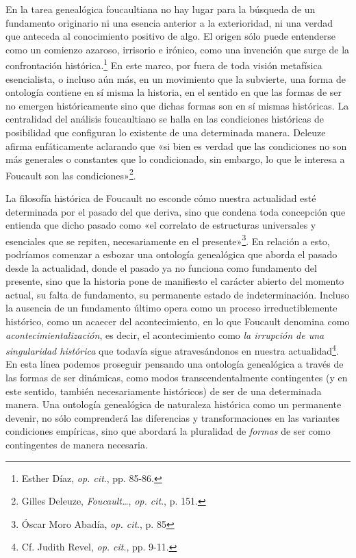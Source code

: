 En la tarea genealógica foucaultiana no hay lugar para la búsqueda de un fundamento originario ni una esencia anterior a la exterioridad, ni una verdad que anteceda al conocimiento positivo de algo. El origen sólo puede entenderse como un comienzo azaroso, irrisorio e irónico, como una invención que surge de la confrontación histórica.\footnote{Esther Díaz, \emph{op. cit}., pp. 85-86.} En este marco, por fuera de toda visión metafísica esencialista, o incluso aún más, en un movimiento que la subvierte, una forma de ontología contiene en sí misma la historia, en el sentido en que las formas de ser no emergen históricamente sino que dichas formas son en sí mismas históricas. La centralidad del análisis foucaultiano se halla en las condiciones históricas de posibilidad que configuran lo existente de una determinada manera. Deleuze afirma enfáticamente aclarando que «si bien es verdad que las condiciones no son más generales o constantes que lo condicionado, sin embargo, lo que le interesa a Foucault son las condiciones»\footnote{Gilles Deleuze, \emph{Foucault\ldots{}}, \emph{op. cit}., p. 151.}.

La filosofía histórica de Foucault no esconde cómo nuestra actualidad esté determinada por el pasado del que deriva, sino que condena toda concepción que entienda que dicho pasado como «el correlato de estructuras universales y esenciales que se repiten, necesariamente en el presente»\footnote{Óscar Moro Abadía, \emph{op. cit}., p. 85}. En relación a esto, podríamos comenzar a esbozar una ontología genealógica que aborda el pasado desde la actualidad, donde el pasado ya no funciona como fundamento del presente, sino que la historia pone de manifiesto el carácter abierto del momento actual, su falta de fundamento, su permanente estado de indeterminación. Incluso la ausencia de un fundamento último opera como un proceso irreductiblemente histórico, como un acaecer del acontecimiento, en lo que Foucault denomina como \emph{acontecimientalización}, es decir, el acontecimiento como \emph{la irrupción de una singularidad histórica} que todavía sigue atravesándonos en nuestra actualidad\footnote{Cf. Judith Revel, \emph{op. cit}., pp. 9-11.}. En esta línea podemos proseguir pensando una ontología genealógica a través de las formas de ser dinámicas, como modos transcendentalmente contingentes (y en este sentido, también necesariamente históricos) de ser de una determinada manera. Una ontología genealógica de naturaleza histórica como un permanente devenir, no sólo comprenderá las diferencias y transformaciones en las variantes condiciones empíricas, sino que abordará la pluralidad de \emph{formas} de ser como contingentes de manera necesaria.

